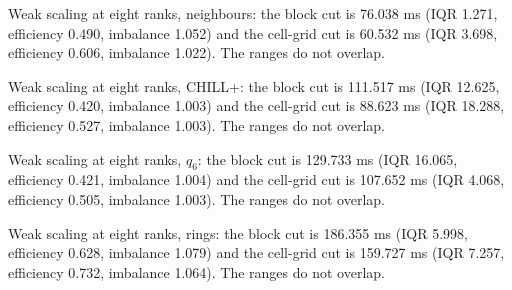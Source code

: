 Weak scaling at eight ranks, neighbours: the block cut is 76.038 ms (IQR 1.271, efficiency 0.490, imbalance 1.052) and the cell-grid cut is 60.532 ms (IQR 3.698, efficiency 0.606, imbalance 1.022). The ranges do not overlap.

Weak scaling at eight ranks, CHILL+: the block cut is 111.517 ms (IQR 12.625, efficiency 0.420, imbalance 1.003) and the cell-grid cut is 88.623 ms (IQR 18.288, efficiency 0.527, imbalance 1.003). The ranges do not overlap.

Weak scaling at eight ranks, $q_6$: the block cut is 129.733 ms (IQR 16.065, efficiency 0.421, imbalance 1.004) and the cell-grid cut is 107.652 ms (IQR 4.068, efficiency 0.505, imbalance 1.003). The ranges do not overlap.

Weak scaling at eight ranks, rings: the block cut is 186.355 ms (IQR 5.998, efficiency 0.628, imbalance 1.079) and the cell-grid cut is 159.727 ms (IQR 7.257, efficiency 0.732, imbalance 1.064). The ranges do not overlap.
